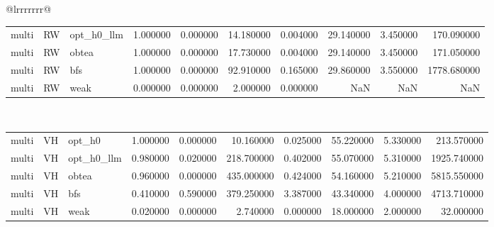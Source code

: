 \begin{table}[ht]
\begin{tabular}{@{}lrrrrrrr@{}}
\begin{tabular}{lllrrrrrrr}
multi & RW & opt_h0_llm & 1.000000 & 0.000000 & 14.180000 & 0.004000 & 29.140000 & 3.450000 & 170.090000 \\
multi & RW & obtea & 1.000000 & 0.000000 & 17.730000 & 0.004000 & 29.140000 & 3.450000 & 171.050000 \\
multi & RW & bfs & 1.000000 & 0.000000 & 92.910000 & 0.165000 & 29.860000 & 3.550000 & 1778.680000 \\
multi & RW & weak & 0.000000 & 0.000000 & 2.000000 & 0.000000 & NaN & NaN & NaN \\
\bottomrule
\end{tabular}
\midrule
{} \\
\begin{tabular}{lllrrrrrrr}
\toprule
\midrule
multi & VH & opt_h0 & 1.000000 & 0.000000 & 10.160000 & 0.025000 & 55.220000 & 5.330000 & 213.570000 \\
multi & VH & opt_h0_llm & 0.980000 & 0.020000 & 218.700000 & 0.402000 & 55.070000 & 5.310000 & 1925.740000 \\
multi & VH & obtea & 0.960000 & 0.000000 & 435.000000 & 0.424000 & 54.160000 & 5.210000 & 5815.550000 \\
multi & VH & bfs & 0.410000 & 0.590000 & 379.250000 & 3.387000 & 43.340000 & 4.000000 & 4713.710000 \\
multi & VH & weak & 0.020000 & 0.000000 & 2.740000 & 0.000000 & 18.000000 & 2.000000 & 32.000000 \\
\bottomrule
\end{tabular}
\midrule
\bottomrule
\end{tabular}
\end{table}
\clearpage
